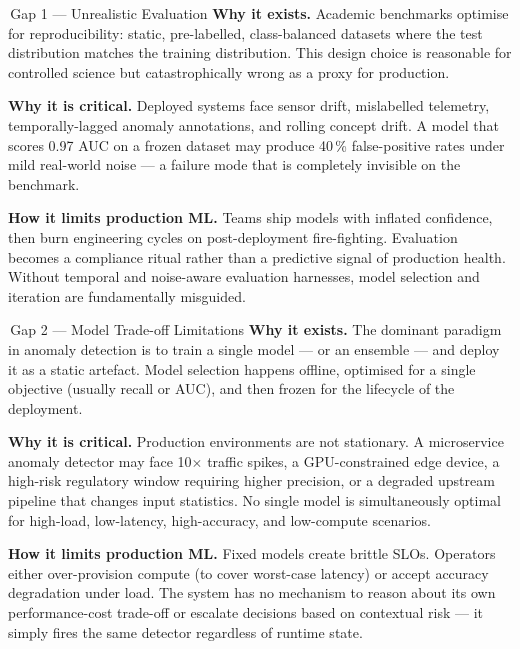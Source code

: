 \documentclass[11pt, a4paper]{article}
\begin{document}
\vspace{8pt}

\begin{gapbox}{\,Gap 1\; —\; Unrealistic Evaluation}
\textbf{Why it exists.}\;
Academic benchmarks optimise for reproducibility: static, pre-labelled, class-balanced datasets where 
the test distribution matches the training distribution. This design choice is reasonable for controlled 
science but catastrophically wrong as a proxy for production.

\smallskip
\textbf{Why it is critical.}\;
Deployed systems face sensor drift, mislabelled telemetry, temporally-lagged anomaly annotations, 
and rolling concept drift. A model that scores 0.97 AUC on a frozen dataset may produce 40\,\% 
false-positive rates under mild real-world noise — a failure mode that is completely invisible 
on the benchmark.

\smallskip
\textbf{How it limits production ML.}\;
Teams ship models with inflated confidence, then burn engineering cycles on post-deployment 
fire-fighting. Evaluation becomes a compliance ritual rather than a predictive signal of production 
health. Without temporal and noise-aware evaluation harnesses, model selection and iteration 
are fundamentally misguided.
\end{gapbox}

\vspace{8pt}

\begin{gapbox}{\,Gap 2\; —\; Model Trade-off Limitations}
\textbf{Why it exists.}\;
The dominant paradigm in anomaly detection is to train a single model — or an ensemble — 
and deploy it as a static artefact. Model selection happens offline, optimised for a single 
objective (usually recall or AUC), and then frozen for the lifecycle of the deployment.

\smallskip
\textbf{Why it is critical.}\;
Production environments are not stationary. A microservice anomaly detector may face 10$\times$ 
traffic spikes, a GPU-constrained edge device, a high-risk regulatory window requiring higher 
precision, or a degraded upstream pipeline that changes input statistics.
No single model is simultaneously optimal for high-load, low-latency, high-accuracy, 
and low-compute scenarios.

\smallskip
\textbf{How it limits production ML.}\;
Fixed models create brittle SLOs. Operators either over-provision compute 
(to cover worst-case latency) or accept accuracy degradation under load. 
The system has no mechanism to reason about its own performance-cost trade-off 
or escalate decisions based on contextual risk — it simply fires the same detector 
regardless of runtime state.
\end{gapbox}
\end{document}
